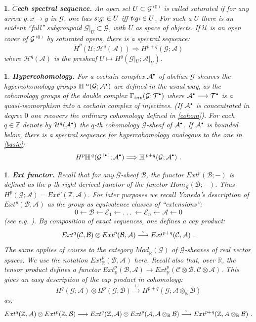 \documentclass[a4paper]{article}
\newtheorem{num}[st]{}
\newcommand{\ii}{\ensuremath{\mathcal{T}}}
\newcommand{\rmap}{\longrightarrow}
\newcommand{\lmap}{\longleftarrow}
\newcommand{\U}{\ensuremath{\mathcal{U}}}
\newcommand{\Ha}{\ensuremath{\mathcal{H}}}
\newcommand{\G}{\ensuremath{\mathcal{G}}}
\newcommand{\A}{\ensuremath{\mathcal{A}}}
\newcommand{\E}{\ensuremath{\mathcal{E}}}
\newcommand{\B}{\ensuremath{\mathcal{B}}}
\newcommand{\C}{\ensuremath{\mathcal{C}}}
\newcommand{\mod}{\ensuremath{\underline{Mod}}}
\newcommand{\ps}{{\raise 1pt\hbox{\tiny (}}}
\newcommand{\pd}{{\raise 1pt\hbox{\tiny )}}}
\newcommand{\nG}[1]{\ensuremath{\G^{\,\ps #1\,\pd}}}
\def\cdot{{\raise 0.5pt\hbox{$\scriptscriptstyle\bullet$}}}
\def\compose{{\raise 1pt\hbox{$\scriptscriptstyle\circ$}}}
\begin{document}
\begin{num}
\emph{
{\bf $\check{C}$ech spectral sequence.} An open set $U \subset \nG{0}$ is called saturated if for any arrow $g: x\rmap y$ in $\G$, one has $s\ps g\pd \in U$ iff $t\ps g\pd \in U$. For such a $U$ there is an evident ``full'' subgroupoid $\G|_{U} \subset \G$, with $U$ as space of objects. If $\U$ is an open cover of $\nG{0}$ by saturated opens, there is a spectral sequence: 
\[ \check{H}^{p}(\U; \Ha^{q}(\A)) \Longrightarrow H^{p+q}(\G ; \A) \]
where $\Ha^{q}(\A)$ is the presheaf $U \mapsto H^{q}(\G|_{U}; \A|_{U})$.
}
\end{num}


\begin{num}
\emph{
{\bf Hypercohomology.} For a cochain complex $\A^{\cdot}$ of abelian $\G$-sheaves the hypercohomology groups $\mathbb{H}^{\, \,n}(\G; \A^{\cdot})$ are defined in the usual way, as the cohomology groups of the double complex $\Gamma_{inv}(\G; \ii^{\cdot})$ where $\A^{\cdot} \rmap \ii^{\cdot}$ is a quasi-isomorphism into a cochain complex of injectives. (If $\A^{\cdot}$ is concentrated in degree $0$ one recovers the ordinary cohomology defined in \ref{cohom}). For each $q \in \mathbb{Z}$ denote by $\Ha^{q}(\A^{\cdot})$ the $q$-th cohomology $\G$-sheaf of $\A^{\cdot}$. If $\A^{\cdot}$ is bounded below, there is a spectral sequence for hypercohomology analogous to the one in \ref{basic}:
\[ H^{p}\mathbb{H}^{\, q}(\nG{\cdot} ; \A^{\cdot}) \Longrightarrow \mathbb{H}^{\, p+q}(\G ; \A^{\cdot}) \ .\]
}
\end{num}


\begin{num}
\label{ext}
\emph{
{\bf Ext functor.} Recall that for any $\G$-sheaf $\B$, the functor $Ext^{p}(\B; -)$ is defined as the $p$-th right derived functor of the functor $Hom_{\G}(\B; -)$. Thus $H^{p}(\G; \A)= Ext^{p}(\mathbb{Z}, \A)$. For later purposes we recall Yoneda's description of $Ext^{p}(\B, \A)$ as the group as equivalence classes of ``extensions'':
\[ 0 \lmap \B \lmap \E_{1} \lmap .\ .\ .\ \lmap \E_{n} \lmap \A \lmap 0 \]
(see e.g. \cite{MaL}). By composition of exact sequences, one defines a cap product:
\[ Ext^{q}(\C, \B) \otimes Ext^{p}(\B, \A) \stackrel{\compose}{\longrightarrow}  Ext^{p+q}(\C, \A) \ .\]
The same applies of course to the category $\mod_{\mathbb{R}}(\G)$ of $\G$-sheaves of real vector spaces. We use the notation $Ext_{\mathbb{R}}^{p}(\B, \A)$ here. Recall also that, over $\mathbb{R}$, the tensor product defines a functor $Ext_{\mathbb{R}}^{p}(\B, \A) \rmap Ext_{\mathbb{R}}^{p}(\C \otimes \B,\C \otimes \A)$. This gives an easy description of the cap product in cohomology:
\[ H^{q}(\G; \A) \otimes H^{p}(\G; \B) \stackrel{\cup}{\longrightarrow} H^{p+q}(\G; \A \otimes_{\mathbb{R}}\B ) \]
as:
\[ Ext^{q}(\mathbb{Z}, \A) \otimes Ext^{p}(\mathbb{Z}, \B) \rmap Ext^{q}(\mathbb{Z}, \A) \otimes Ext^{p}(\A, \A \otimes_{\mathbb{R}}\B) \stackrel{\compose}{\rmap} Ext^{p+q}(\mathbb{Z}, A \otimes_{\mathbb{R}}\B) \ .\] 
}
\end{num}
\end{document}

